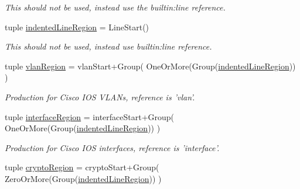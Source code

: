 \begin{DoxyCompactItemize}
\begin{DoxyCompactList}\small\item\em This should not be used, instead use the builtin\-:line reference. \end{DoxyCompactList}\item 
\hypertarget{classxutools_1_1parsers_1_1_cisco_i_o_s_parser_afd57a8ec6b65941a62ef834f94e4bdd0}{tuple \hyperlink{classxutools_1_1parsers_1_1_cisco_i_o_s_parser_afd57a8ec6b65941a62ef834f94e4bdd0}{indented\-Line\-Region} = Line\-Start()}\label{classxutools_1_1parsers_1_1_cisco_i_o_s_parser_afd57a8ec6b65941a62ef834f94e4bdd0}

\begin{DoxyCompactList}\small\item\em This should not be used, instead use builtin\-:line reference. \end{DoxyCompactList}\item 
\hypertarget{classxutools_1_1parsers_1_1_cisco_i_o_s_parser_a8ec65a187a6e9a9f9aa1474cebbba911}{tuple \hyperlink{classxutools_1_1parsers_1_1_cisco_i_o_s_parser_a8ec65a187a6e9a9f9aa1474cebbba911}{vlan\-Region} = vlan\-Start+Group( One\-Or\-More(Group(\hyperlink{classxutools_1_1parsers_1_1_cisco_i_o_s_parser_afd57a8ec6b65941a62ef834f94e4bdd0}{indented\-Line\-Region})) )}\label{classxutools_1_1parsers_1_1_cisco_i_o_s_parser_a8ec65a187a6e9a9f9aa1474cebbba911}

\begin{DoxyCompactList}\small\item\em Production for Cisco I\-O\-S V\-L\-A\-Ns, reference is 'vlan'. \end{DoxyCompactList}\item 
\hypertarget{classxutools_1_1parsers_1_1_cisco_i_o_s_parser_a9e6d9c28d18016c8ec18503b707d0b3e}{tuple \hyperlink{classxutools_1_1parsers_1_1_cisco_i_o_s_parser_a9e6d9c28d18016c8ec18503b707d0b3e}{interface\-Region} = interface\-Start+Group( One\-Or\-More(Group(\hyperlink{classxutools_1_1parsers_1_1_cisco_i_o_s_parser_afd57a8ec6b65941a62ef834f94e4bdd0}{indented\-Line\-Region})) )}\label{classxutools_1_1parsers_1_1_cisco_i_o_s_parser_a9e6d9c28d18016c8ec18503b707d0b3e}

\begin{DoxyCompactList}\small\item\em Production for Cisco I\-O\-S interfaces, reference is 'interface'. \end{DoxyCompactList}\item 
\hypertarget{classxutools_1_1parsers_1_1_cisco_i_o_s_parser_abba505010cea84487f03405b4ab06864}{tuple \hyperlink{classxutools_1_1parsers_1_1_cisco_i_o_s_parser_abba505010cea84487f03405b4ab06864}{crypto\-Region} = crypto\-Start+Group( Zero\-Or\-More(Group(\hyperlink{classxutools_1_1parsers_1_1_cisco_i_o_s_parser_afd57a8ec6b65941a62ef834f94e4bdd0}{indented\-Line\-Region})) )}\label{classxutools_1_1parsers_1_1_cisco_i_o_s_parser_abba505010cea84487f03405b4ab06864}


\end{DoxyCompactItemize}
